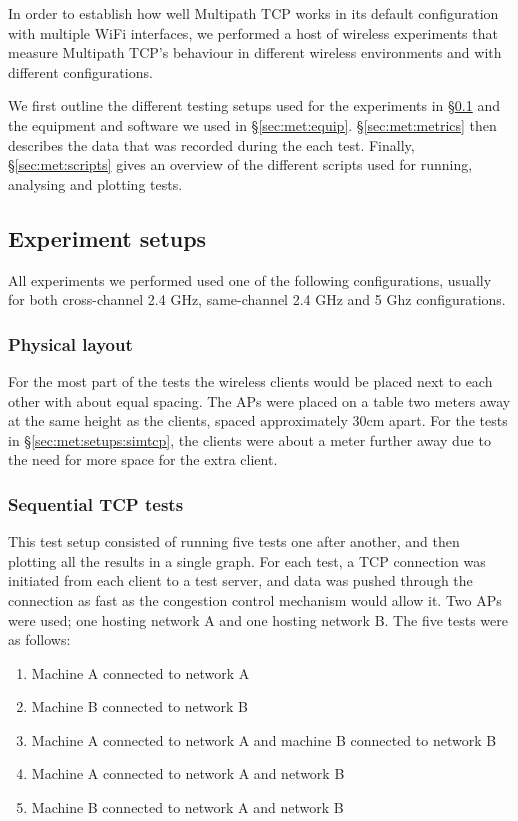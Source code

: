 In order to establish how well Multipath TCP works in its default configuration
with multiple WiFi interfaces, we performed a host of wireless experiments that
measure Multipath TCP's behaviour in different wireless environments and with
different configurations.

We first outline the different testing setups used for the experiments in
\S\ref{sec:met:setups} and the equipment and software we used in
\S\ref{sec:met:equip}. \S\ref{sec:met:metrics} then describes the
data that was recorded during the each test. Finally,
\S\ref{sec:met:scripts} gives an overview of the different scripts used
for running, analysing and plotting tests.

\subsection{Experiment setups}
\label{sec:met:setups}
All experiments we performed used one of the following configurations, usually
for both cross-channel 2.4 GHz, same-channel 2.4 GHz and 5 Ghz configurations.

\subsubsection{Physical layout}
For the most part of the tests the wireless clients would be placed next to each
other with about equal spacing. The APs were placed on a table two meters away
at the same height as the clients, spaced approximately 30cm apart. For the
tests in \S\ref{sec:met:setups:simtcp}, the clients were about a meter
further away due to the need for more space for the extra client.

\subsubsection{Sequential TCP tests}
\label{sec:met:setups:seqtcp}
This test setup consisted of running five tests one after another, and then
plotting all the results in a single graph. For each test, a TCP connection was
initiated from each client to a test server, and data was pushed through the
connection as fast as the congestion control mechanism would allow it. Two APs
were used; one hosting network A and one hosting network B. The five tests were
as follows:

\begin{enumerate}
  \item Machine A connected to network A
  \item Machine B connected to network B
  \item Machine A connected to network A and machine B connected to network B
  \item Machine A connected to network A and network B
  \item Machine B connected to network A and network B
\end{enumerate}

